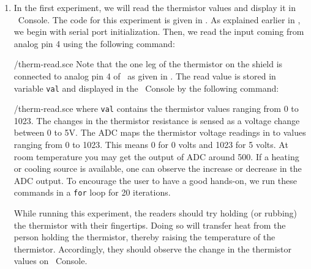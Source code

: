 \begin{enumerate}
  \item In the first experiment, we will read the thermistor values and display it in
        \scilab\ Console. The code for this experiment is
        given in . As explained earlier in ,
        we begin with serial port initialization. Then, we read the input coming from
        analog pin 4 using the following command:
        
        {\LocTHERMscicode/therm-read.sce}
        Note that the one leg of the thermistor on
        the shield is connected to analog pin 4 of \arduino\,
        as given in . The read value is stored in variable {\tt val} and
        displayed in the \scilab\ Console by the following command:
        
        {\LocTHERMscicode/therm-read.sce} where {\tt val} contains
        the thermistor values ranging from 0 to 1023. The changes in
        the thermistor resistance is sensed as a voltage change between 0 to
        5V. The ADC maps the thermistor voltage readings in to values
        ranging from 0 to 1023. This means 0 for 0 volts and 1023 for 5
        volts. At room temperature you may get the
        output of ADC around 500. If a heating or cooling source is available,
        one can observe the increase or decrease in the ADC output. To
        encourage the user to have a good hands-on, we run these commands in
        a {\tt for} loop for 20 iterations.

        While running this experiment,
        the readers should try holding (or rubbing) the thermistor with their fingertips.
        Doing so will transfer heat from the person holding the
        thermistor, thereby raising the temperature of the thermistor. Accordingly, they should observe the change in the thermistor
        values on \scilab\ Console.




\end{enumerate}
